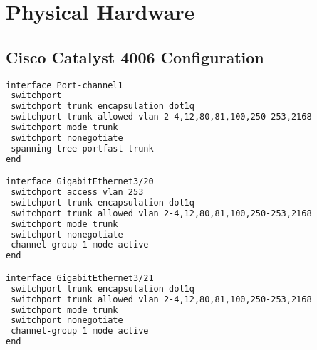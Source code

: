 \documentclass[11pt,letterpaper,oneside]{book}
\begin{document}
\begin{comment}
\begin{lstlisting}[caption={Current Default Route},language=bash]
[root@virsatpaw001 ~]# ip route
192.168.122.0/24 dev eth0  proto kernel  scope link  src 192.168.122.10
169.254.0.0/16 dev eth0  scope link  metric 1002 
default via 192.168.122.1 dev eth0 
\end{lstlisting}
Line 4 displays our current default gateway of 192.168.122.1.

\begin{lstlisting}[caption={Current Resolver},language=bash]
[root@virsatpaw001 ~]# cat /etc/resolv.conf
nameserver 192.168.122.1
\end{lstlisting}


Based on your device name there will be a corresponding ifcfg file.  DEVICE, IPADDR, NETMASK, GATEWAY and DNS1,2 will be based on your network.  Modify the file removing options that don't exist in the example below, adding the options that do.
\begin{lstlisting}[caption={Modify Ethernet interface from DHCP to static},language=bash]
vi /etc/sysconfig/network-scripts/ifcfg-
\end{lstlisting}

\begin{lstlisting}[caption={Example Ethernet configuration},language=bash]
DEVICE=eth0
TYPE=Ethernet
ONBOOT=yes
NM_CONTROLLED=no
BOOTPROTO=static
NAME="eth0"
IPADDR=192.168.122.10
NETMASK=255.255.255.0
GATEWAY=192.168.122.1
DNS1=192.168.122.1
\end{lstlisting}
At this point let us reboot.  When the virtual machine is available make sure that you can still reach the default gateway, then proceed to the next section.

\end{comment}

\chapter{Physical Hardware}
\section{Cisco Catalyst 4006 Configuration}
\begin{lstlisting}[caption={Trunk and Port Channel},language=bash]
interface Port-channel1
 switchport
 switchport trunk encapsulation dot1q
 switchport trunk allowed vlan 2-4,12,80,81,100,250-253,2168
 switchport mode trunk
 switchport nonegotiate
 spanning-tree portfast trunk
end

interface GigabitEthernet3/20
 switchport access vlan 253
 switchport trunk encapsulation dot1q
 switchport trunk allowed vlan 2-4,12,80,81,100,250-253,2168
 switchport mode trunk
 switchport nonegotiate
 channel-group 1 mode active
end

interface GigabitEthernet3/21
 switchport trunk encapsulation dot1q
 switchport trunk allowed vlan 2-4,12,80,81,100,250-253,2168
 switchport mode trunk
 switchport nonegotiate
 channel-group 1 mode active
end
\end{lstlisting}
\end{document}
